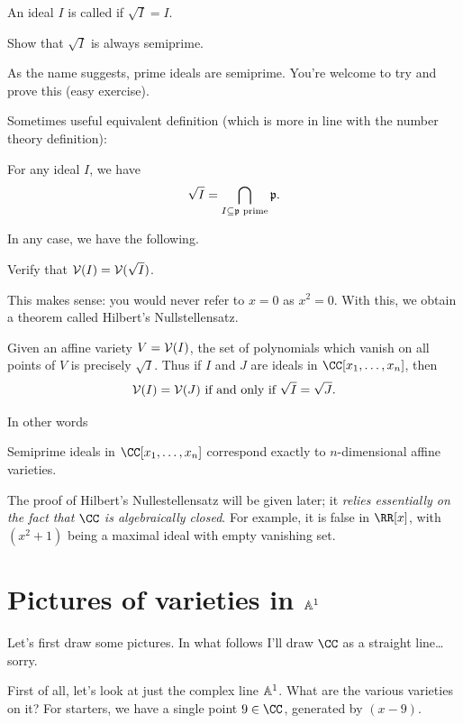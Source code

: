 \documentclass[11pt]{scrreprt}
\begin{document}
\begin{definition}
	An ideal $I$ is called  if $\sqrt I = I$.
\end{definition}
\begin{ques}
	Show that $\sqrt I$ is always semiprime.
\end{ques}
\begin{remark}
	As the name suggests, prime ideals are semiprime.
	You're welcome to try and prove this (easy exercise).
\end{remark}
Sometimes useful equivalent definition
(which is more in line with the number theory definition):
\begin{theorem}
	For any ideal $I$, we have
	\[ \sqrt I = \bigcap_{I \subseteq \mathfrak p \text{ prime}} \mathfrak p. \]
\end{theorem}

In any case, we have the following.
\begin{ques}
	Verify that $\mathcal V(I) = \mathcal V(\sqrt I)$.
\end{ques}
This makes sense: you would never refer to $x=0$ as $x^2=0$.
With this, we obtain a theorem called Hilbert's Nullstellensatz.
\begin{theorem}
	Given an affine variety $V = \mathcal V(I)$, the set of polynomials which vanish
	on all points of $V$ is precisely $\sqrt I$.
	Thus if $I$ and $J$ are ideals in $\CC[x_1, \dots, x_n]$,
	then \[ \mathcal V(I) = \mathcal V(J) \text{ if and only if $\sqrt I = \sqrt J$}. \]
\end{theorem}
In other words
\begin{moral}
	Semiprime ideals in $\CC[x_1, \dots, x_n]$ correspond
	exactly to $n$-dimensional affine varieties.
\end{moral}
The proof of Hilbert's Nullestellensatz will be given later;
it \emph{relies essentially on the fact that $\CC$ is algebraically closed}.
For example, it is false in $\RR[x]$,
with $(x^2+1)$ being a maximal ideal with empty vanishing set.

\section{Pictures of varieties in $\mathbb A^1$}
Let's first draw some pictures.
In what follows I'll draw $\CC$ as a straight line\dots sorry.

First of all, let's look at just the complex line $\mathbb A^1$.
What are the various varieties on it?
For starters, we have a single point $9 \in \CC$,
generated by $(x-9)$.
\end{document}
